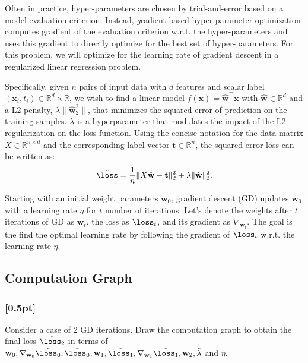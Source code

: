     Often in practice, hyper-parameters are chosen by trial-and-error based on a model evaluation criterion. Instead, {\textit gradient-based hyper-parameter optimization} computes gradient of the evaluation criterion w.r.t. the hyper-parameters and uses this gradient to directly optimize for the best set of hyper-parameters. For this problem, we will optimize for the learning rate of gradient descent in a regularized linear regression problem.
    
    Specifically, given $n$ pairs of input data with $d$ features and scalar label $(\mathbf{x}_i,t_i)\in\mathbb{R} ^{d}\times\mathbb{R}$, we wish to find a linear model $f(\mathbf{x}) = \hat{\mathbf{w}}^\top\mathbf{x}$ with $\hat{\mathbf{w}}\in\mathbb{R}^d$ and a L2 penalty, $\lambda \|\hat{\mathbf{w}}^2_2\|$, that minimizes the squared error of prediction on the training samples. $\lambda$ is a hyperparameter that modulates the impact of the L2 regularization on the loss function. Using the concise notation for the data matrix $X \in \mathbb{R}^{n \times d}$ and the corresponding label vector $\mathbf{t} \in \mathbb{R}^n$, the squared error loss can be written as:
        \begin{align*}
            \Tilde{\loss}
        =   
             \frac{1}{n}\| X \hat{\mathbf{w}} - \mathbf{t} \|_2^2 + \lambda \|\hat{\mathbf{w}}\|_2^2.
        \end{align*}
        
    Starting with an initial weight parameters $\mathbf{w}_0$, gradient descent (GD) updates $\mathbf{w}_0$ with a learning rate $\eta$ for $t$ number of iterations. Let's denote the weights after $t$ iterations of GD as $\mathbf{w}_t$, the loss as $\loss_t$, and its gradient as $\nabla_{\mathbf{w}_t}$. The goal is the find the optimal learning rate by following the gradient of $\loss_t$ w.r.t. the learning rate $\eta$.
    
    \subsection{Computation Graph} 
        \subsubsection{{\color{blue}[0.5pt]} \LIV}
        Consider a case of 2 GD iterations. Draw the computation graph to obtain the final loss $\Tilde{\loss_2}$ in terms of $\mathbf{w}_0, \nabla_{\mathbf{w}_0} \Tilde{\loss_0}, \Tilde{\loss_0}, \mathbf{w}_1, \Tilde{\loss_1}, \nabla_{\mathbf{w}_1} \Tilde{\loss_1}, \mathbf{w}_2, \Tilde{\lambda}$ and $\eta$.
   
